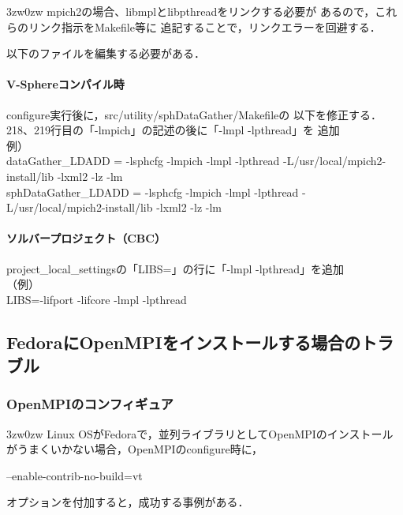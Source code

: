 \begin{indentation}{3zw}{0zw}
mpich2の場合、libmplとlibpthreadをリンクする必要が
あるので，これらのリンク指示をMakefile等に
追記することで，リンクエラーを回避する．

以下のファイルを編集する必要がある．

\paragraph{V-Sphereコンパイル時}
configure実行後に，src/utility/sphDataGather/Makefileの
以下を修正する．\\
218、219行目の「-lmpich」の記述の後に「-lmpl -lpthread」を
追加\\
例）\\
dataGather\_LDADD = -lsphcfg -lmpich -lmpl -lpthread -L/usr/local/mpich2-install/lib -lxml2 -lz -lm\\
sphDataGather\_LDADD = -lsphcfg -lmpich -lmpl -lpthread -L/usr/local/mpich2-install/lib -lxml2 -lz -lm

\paragraph{ソルバープロジェクト（CBC）}
project\_local\_settingsの「LIBS=」の行に「-lmpl -lpthread」を追加\\
（例）\\
LIBS=-lifport -lifcore -lmpl -lpthread

\end{indentation}

\subsection{FedoraにOpenMPIをインストールする場合のトラブル}
\subsubsection{OpenMPIのコンフィギュア}
\begin{indentation}{3zw}{0zw}
Linux OSがFedoraで，並列ライブラリとしてOpenMPIのインストールがうまくいかない場合，OpenMPIのconfigure時に，
\begin{program}
--enable-contrib-no-build=vt
\end{program}
オプションを付加すると，成功する事例がある．
\end{indentation}

